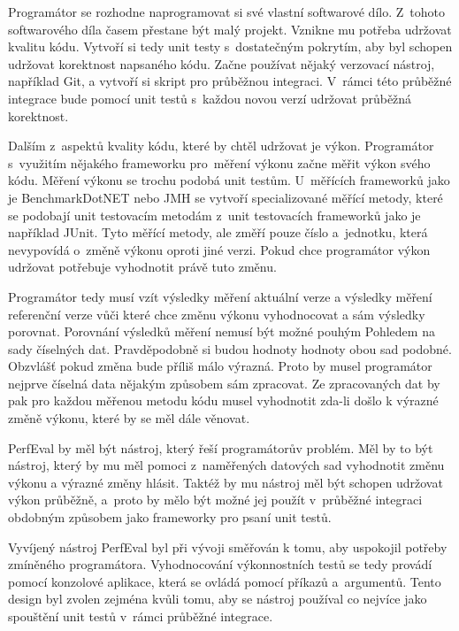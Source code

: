 Programátor se rozhodne naprogramovat si své vlastní softwarové dílo. Z~tohoto softwarového díla
časem přestane být malý projekt. Vznikne mu potřeba udržovat kvalitu kódu.
Vytvoří si tedy unit testy s~dostatečným pokrytím, aby byl schopen udržovat korektnost napsaného kódu.
Začne používat nějaký verzovací nástroj, například Git, a vytvoří si skript pro průběžnou integraci.
V~rámci této průběžné integrace bude pomocí unit testů s~každou novou verzí udržovat průběžná korektnost.

Dalším z~aspektů kvality kódu, které by chtěl udržovat je výkon. Programátor s~využitím nějakého frameworku pro~měření výkonu začne měřit výkon svého kódu.
Měření výkonu se trochu podobá unit testům. U~měřících frameworků jako je BenchmarkDotNET nebo JMH se vytvoří specializované měřící metody,
které se podobají unit testovacím metodám z~unit testovacích frameworků jako je například JUnit.
Tyto měřící metody, ale změří pouze číslo a~jednotku, která nevypovídá o~změně výkonu oproti jiné verzi.
Pokud chce programátor výkon udržovat potřebuje vyhodnotit právě tuto změnu.

Programátor tedy musí vzít výsledky měření aktuální verze a výsledky měření referenční verze vůči které chce
změnu výkonu vyhodnocovat a sám výsledky porovnat. Porovnání výsledků měření nemusí být možné pouhým Pohledem
na sady číselných dat. Pravděpodobně si budou hodnoty hodnoty obou sad podobné. Obzvlášť pokud změna bude příliš málo výrazná.
Proto by musel programátor nejprve číselná data nějakým způsobem sám zpracovat. Ze zpracovaných dat by pak pro každou měřenou metodu
kódu musel vyhodnotit zda-li došlo k výrazné změně výkonu, které by se měl dále věnovat.

PerfEval by měl být nástroj, který řeší programátorův problém. Měl by to být nástroj, který by mu měl pomoci
z~naměřených datových sad vyhodnotit změnu výkonu a výrazné změny hlásit. Taktéž by mu nástroj měl být schopen
udržovat výkon průběžně, a~proto by mělo být možné jej použít v~průběžné integraci obdobným způsobem jako frameworky
pro psaní unit testů.

Vyvíjený nástroj PerfEval byl při vývoji směřován k tomu, aby uspokojil potřeby zmíněného programátora.
Vyhodnocování výkonnostních testů se tedy provádí pomocí konzolové aplikace, která se ovládá pomocí
příkazů a~argumentů. Tento design byl zvolen zejména kvůli tomu, aby se nástroj používal co nejvíce
jako spouštění unit testů v~rámci průběžné integrace.
